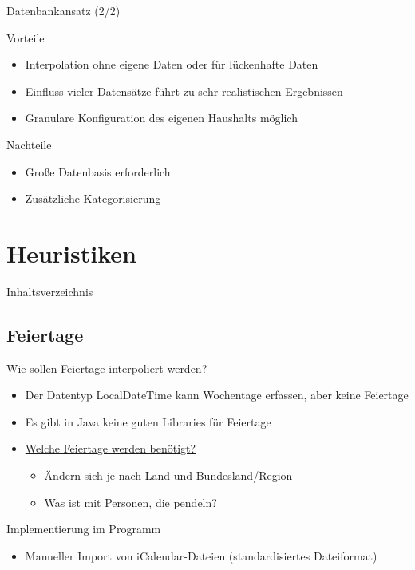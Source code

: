 \begin{frame}{Datenbankansatz (2/2)}
\begin{block}{Vorteile}
\begin{itemize}
	\item Interpolation ohne eigene Daten oder für lückenhafte Daten
	\item Einfluss vieler Datensätze führt zu sehr realistischen Ergebnissen
	\item Granulare Konfiguration des eigenen Haushalts möglich
\end{itemize}
\end{block}
\begin{block}{Nachteile}
\begin{itemize}
	\item Große Datenbasis erforderlich
	\item Zusätzliche Kategorisierung
\end{itemize}
\end{block}
\end{frame}

\section{Heuristiken}
\begin{frame}{Inhaltsverzeichnis}
\tableofcontents[currentsection]
\end{frame}

\subsection{Feiertage}
\begin{frame}{\insertsubsectionhead}
\begin{block}{Wie sollen Feiertage interpoliert werden?}
\begin{itemize}
\item Der Datentyp LocalDateTime kann Wochentage erfassen, aber keine Feiertage
\item Es gibt in Java keine guten Libraries für Feiertage
\item \underline{Welche Feiertage werden benötigt?}
\begin{itemize}
\item Ändern sich je nach Land und Bundesland/Region
\item Was ist mit Personen, die pendeln?
\end{itemize}
\end{itemize}
\end{block}
\begin{block}{Implementierung im Programm}
\begin{itemize}
\item Manueller Import von iCalendar-Dateien (standardisiertes Dateiformat)
\end{itemize}
\end{block}
\end{frame}

